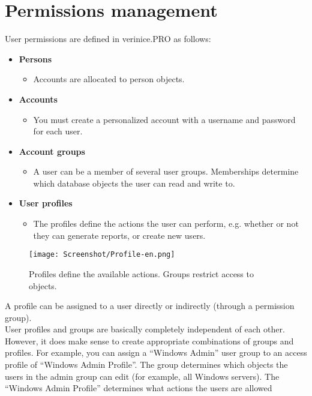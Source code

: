 \documentclass[a4paper,10pt]{book}
\begin{document}
\section{Permissions management} \label{sec:permissions-management}
User permissions are defined in verinice.PRO as follows:
\begin{itemize}
\item \textbf{Persons}
  \begin{itemize}
	\item Accounts are allocated to person objects.
   \end{itemize}
\item \textbf{Accounts}
  \begin{itemize}
   \item You must create a personalized account with a username and password for each user.
  \end{itemize}
\item \textbf{Account groups}
  \begin{itemize}
   \item A user can be a member of several user groups. Memberships determine which database objects the user can read and write to.
  \end{itemize}
\item \textbf{User profiles}
   \begin{itemize}
    \item The profiles define the actions the user can perform, e.g. whether or not they can generate reports, or create new users.
   \end{itemize}
\end{itemize}
\begin{figure}[htb!]
  \centering
  \texttt{[image: Screenshot/Profile-en.png]}
  \caption{\label{Profiles define the available actions. Groups restrict access to objects.} Profiles define the available actions. Groups restrict access to objects.}
\end{figure}
A profile can be assigned to a user directly or indirectly (through a permission group).
\newline\\
User profiles and groups are basically completely independent of each other. However, it does make sense to create
appropriate combinations of groups and profiles. For example, you can assign a ``Windows Admin'' user group to an
access profile of ``Windows Admin Profile''. The group determines which objects the users in the admin group can
edit (for example, all Windows servers). The ``Windows Admin Profile'' determines what actions the users are allowed
\end{document}
